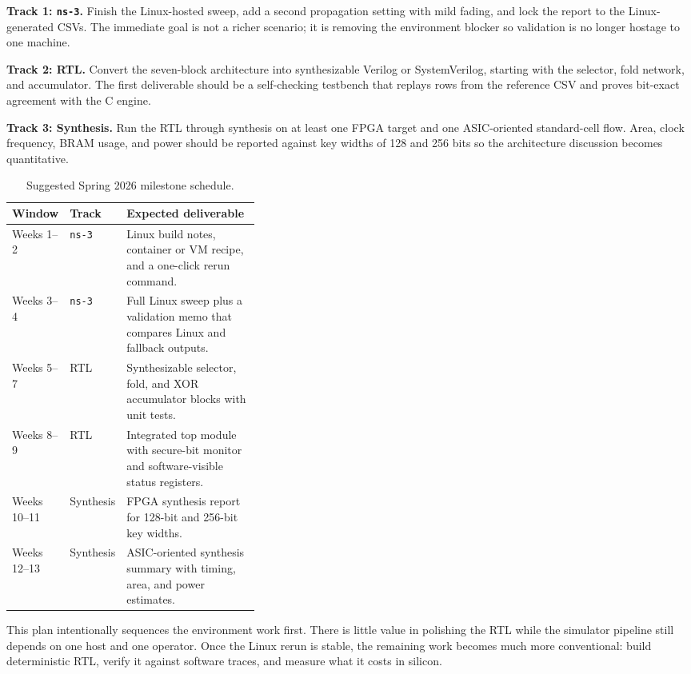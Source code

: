 \documentclass[11pt]{article}
\begin{document}
\textbf{Track 1: \texttt{ns-3}.} Finish the Linux-hosted sweep, add a second propagation setting with mild fading, and lock the report to the Linux-generated CSVs. The immediate goal is not a richer scenario; it is removing the environment blocker so validation is no longer hostage to one machine.

\textbf{Track 2: RTL.} Convert the seven-block architecture into synthesizable Verilog or SystemVerilog, starting with the selector, fold network, and accumulator. The first deliverable should be a self-checking testbench that replays rows from the reference CSV and proves bit-exact agreement with the C engine.

\textbf{Track 3: Synthesis.} Run the RTL through synthesis on at least one FPGA target and one ASIC-oriented standard-cell flow. Area, clock frequency, BRAM usage, and power should be reported against key widths of 128 and 256 bits so the architecture discussion becomes quantitative.

\begin{table}[t]
\centering
\caption{Suggested Spring 2026 milestone schedule.}
\begin{tabularx}{\linewidth}{>{\raggedright\arraybackslash}p{0.18\linewidth} >{\raggedright\arraybackslash}p{0.18\linewidth} Y}
\toprule
Window & Track & Expected deliverable \\
\midrule
Weeks 1--2 & \texttt{ns-3} & Linux build notes, container or VM recipe, and a one-click rerun command. \\
Weeks 3--4 & \texttt{ns-3} & Full Linux sweep plus a validation memo that compares Linux and fallback outputs. \\
Weeks 5--7 & RTL & Synthesizable selector, fold, and XOR accumulator blocks with unit tests. \\
Weeks 8--9 & RTL & Integrated top module with secure-bit monitor and software-visible status registers. \\
Weeks 10--11 & Synthesis & FPGA synthesis report for 128-bit and 256-bit key widths. \\
Weeks 12--13 & Synthesis & ASIC-oriented synthesis summary with timing, area, and power estimates. \\
\bottomrule
\end{tabularx}
\end{table}

This plan intentionally sequences the environment work first. There is little value in polishing the RTL while the simulator pipeline still depends on one host and one operator. Once the Linux rerun is stable, the remaining work becomes much more conventional: build deterministic RTL, verify it against software traces, and measure what it costs in silicon.
\end{document}
